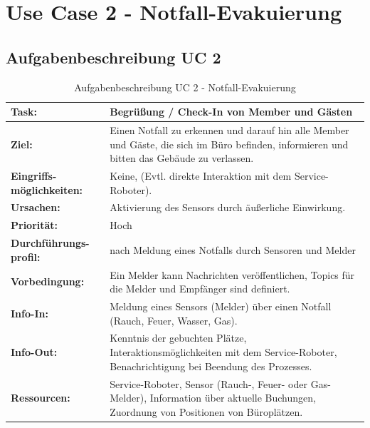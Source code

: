 \documentclass[
  ngerman           %
  ,twoside          %
  ,11pt
  ,pdftex
]{report}
\begin{document}
\begin{landscape}
  
\end{landscape}
\pagebreak
\label{appendix:user-story-uc2}
%
\section*{Use Case 2 - Notfall-Evakuierung}
\subsection*{Aufgabenbeschreibung UC 2}
\begin{table}[hbt!]
    \begin{center}
        \begin{tabular}{| p{3cm} | p{12.75cm} | }
            \hline
                \textbf{Task:} & \textbf{Begrüßung / Check-In von Member und Gästen} \\
            \hline
                \textbf{Ziel:} & Einen Notfall zu erkennen und darauf hin alle Member und Gäste, die sich im Büro befinden, informieren und bitten das Gebäude zu verlassen. \\
            \hline
                \textbf{Eingriffs-möglichkeiten:} & Keine, (Evtl. direkte Interaktion mit dem Service-Roboter). \\
            \hline
                \textbf{Ursachen:} & Aktivierung des Sensors durch äußerliche Einwirkung. \\
            \hline
                \textbf{Priorität:} & Hoch \\
            \hline
                \textbf{Durchführungs-profil:} & nach Meldung eines Notfalls durch Sensoren und Melder \\ 
            \hline
                \textbf{Vorbedingung:} & Ein Melder kann Nachrichten veröffentlichen, Topics für die Melder und Empfänger sind definiert. \\
            \hline 
                \textbf{Info-In:} & Meldung eines Sensors (Melder) über einen Notfall (Rauch, Feuer, Wasser, Gas). \\
            \hline
                \textbf{Info-Out:} & Kenntnis der gebuchten Plätze, Interaktionsmöglichkeiten mit dem Service-Roboter, Benachrichtigung bei Beendung des Prozesses. \\
            \hline
                \textbf{Ressourcen:} & Service-Roboter, Sensor (Rauch-, Feuer- oder Gas-Melder), Information über aktuelle Buchungen, Zuordnung von Positionen von Büroplätzen. \\
            \hline
        \end{tabular}
    \end{center}
    \caption{Aufgabenbeschreibung UC 2 - Notfall-Evakuierung}
    \label{tab:evacuation}
\end{table}
\end{document}
